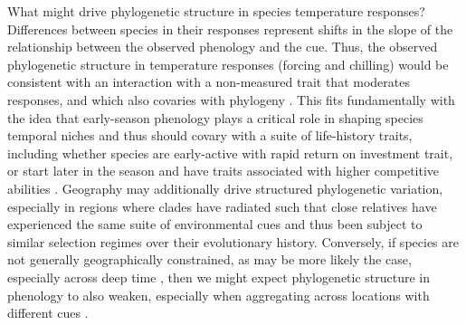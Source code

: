 \documentclass{article}\usepackage[]{graphicx}\usepackage[]{color}
\begin{document}
What might drive phylogenetic structure in species temperature responses? Differences between species in their responses represent shifts in the slope of the relationship between the observed phenology and the cue. Thus, the observed phylogenetic structure in temperature responses (forcing and chilling) would be consistent with an interaction with a non-measured trait that moderates responses, and which also covaries with phylogeny \citep{davies2019phylogenetically}. This fits fundamentally with the idea that early-season phenology plays a critical role in shaping species temporal niches \citep{gotelli1996} and thus should covary with a suite of life-history traits, including whether species are early-active with rapid return on investment trait, or start later in the season and have traits associated with higher competitive abilities \citep[e.g.,][]{Grime:1977sw,wolkovich2014aob}. Geography may additionally drive structured phylogenetic variation, especially in regions where clades have radiated such that close relatives have experienced the same suite of environmental cues and thus been subject to similar selection regimes over their evolutionary history. Conversely, if species are not generally geographically constrained, as may be more likely the case, especially across deep time \citep{fitzturelli2006}, then we might expect phylogenetic structure in phenology to also weaken, especially when aggregating across locations with different cues \citep{davies2013phylogenetic}.%
\end{document}
